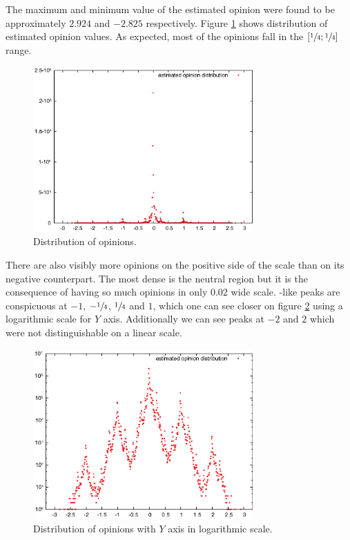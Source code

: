       The maximum and minimum value of the estimated opinion were found to be approximately $2.924$ and $-2.825$ respectively. Figure \ref{fig:opinion_distribution_reg} shows distribution of estimated opinion values. As expected, most of the opinions fall in the $[\sfrac{1}{4};\sfrac{1}{4}]$ range.
      \begin{figure}[H]
        \centering
        \includegraphics[width=0.75\textwidth]{chapters/03_implementation/opidist}
        \caption{Distribution of opinions.}
        \label{fig:opinion_distribution_reg}
      \end{figure}
      There are also visibly more opinions on the positive side of the scale than on its negative counterpart. The most dense is the neutral region but it is the consequence of having so much opinions in only $0.02$ wide scale. -like peaks are conspicuous at $-1$, $-\sfrac{1}{4}$, $\sfrac{1}{4}$ and $1$, which one can see closer on figure \ref{fig:opinion_distribution_log} using a logarithmic scale for $Y$ axis. Additionally we can see peaks at $-2$ and $2$ which were not distinguishable on a linear scale.
      \begin{figure}[H]
        \centering
        \includegraphics[width=0.75\textwidth]{chapters/03_implementation/opidist_log}
        \caption{Distribution of opinions with $Y$ axis in logarithmic scale.}
        \label{fig:opinion_distribution_log}
      \end{figure}
